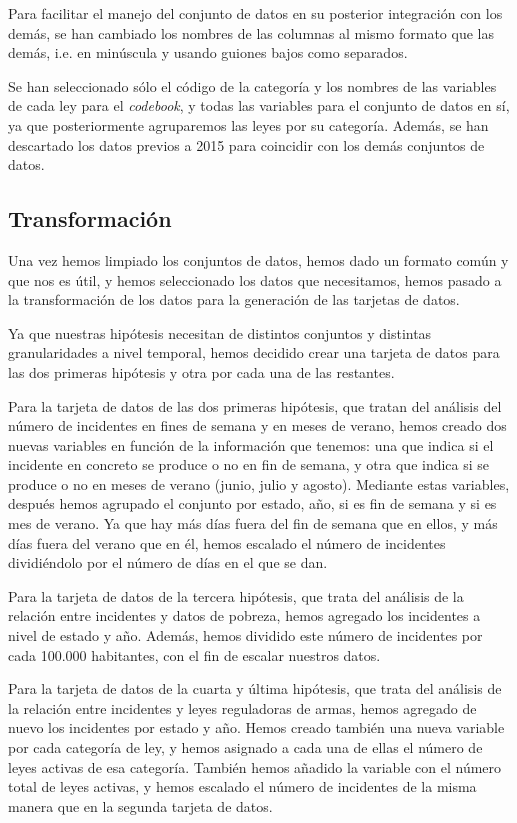 \documentclass[11pt,a4paper]{article}
\begin{document}
Para facilitar el manejo del conjunto de datos en su posterior integración con los demás, se han cambiado los nombres de las columnas al mismo formato que las demás, i.e. en minúscula y usando guiones bajos como separados.

Se han seleccionado sólo el código de la categoría y los nombres de las variables de cada ley para el \textit{codebook}, y todas las variables para el conjunto de datos en sí, ya que posteriormente agruparemos las leyes por su categoría. Además, se han descartado los datos previos a 2015 para coincidir con los demás conjuntos de datos.

\subsection{Transformación}

Una vez hemos limpiado los conjuntos de datos, hemos dado un formato común y que nos es útil, y hemos seleccionado los datos que necesitamos, hemos pasado a la transformación de los datos para la generación de las tarjetas de datos.

Ya que nuestras hipótesis necesitan de distintos conjuntos y distintas granularidades a nivel temporal, hemos decidido crear una tarjeta de datos para las dos primeras hipótesis y otra por cada una de las restantes.

Para la tarjeta de datos de las dos primeras hipótesis, que tratan del análisis del número de incidentes en fines de semana y en meses de verano, hemos creado dos nuevas variables en función de la información que tenemos: una que indica si el incidente en concreto se produce o no en fin de semana, y otra que indica si se produce o no en meses de verano (junio, julio y agosto). Mediante estas variables, después hemos agrupado el conjunto por estado, año, si es fin de semana y si es mes de verano. Ya que hay más días fuera del fin de semana que en ellos, y más días fuera del verano que en él, hemos escalado el número de incidentes dividiéndolo por el número de días en el que se dan.

Para la tarjeta de datos de la tercera hipótesis, que trata del análisis de la relación entre incidentes y datos de pobreza, hemos agregado los incidentes a nivel de estado y año. Además, hemos dividido este número de incidentes por cada 100.000 habitantes, con el fin de escalar nuestros datos.

Para la tarjeta de datos de la cuarta y última hipótesis, que trata del análisis de la relación entre incidentes y leyes reguladoras de armas, hemos agregado de nuevo los incidentes por estado y año. Hemos creado también una nueva variable por cada categoría de ley, y hemos asignado a cada una de ellas el número de leyes activas de esa categoría. También hemos añadido la variable con el número total de leyes activas, y hemos escalado el número de incidentes de la misma manera que en la segunda tarjeta de datos.
\end{document}
